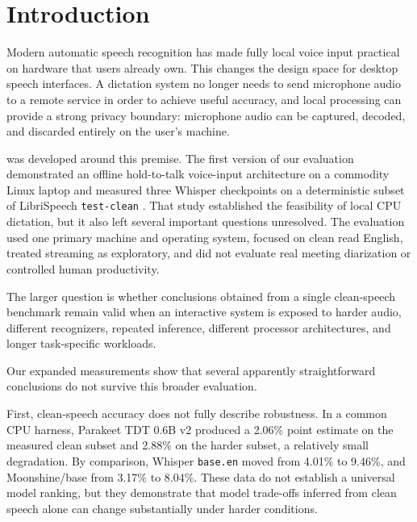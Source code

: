 \section{Introduction}

Modern automatic speech recognition has made fully local voice input practical on hardware that
users already own. This changes the design space for desktop speech interfaces. A dictation
system no longer needs to send microphone audio to a remote service in order to achieve useful
accuracy, and local processing can provide a strong privacy boundary: microphone audio can be
captured, decoded, and discarded entirely on the user's machine.

\YazSes{} was developed around this premise. The first version of our evaluation
\citep{yazses2026v1} demonstrated an offline hold-to-talk voice-input architecture on a commodity
Linux laptop and measured three Whisper checkpoints on a deterministic subset of LibriSpeech
\texttt{test-clean} \citep{panayotov2015librispeech}. That study established the feasibility of
local CPU dictation, but it also left several important questions unresolved. The evaluation used
one primary machine and operating system, focused on clean read English, treated streaming as
exploratory, and did not evaluate real meeting diarization or controlled human productivity.

The larger question is whether conclusions obtained from a single clean-speech benchmark remain
valid when an interactive system is exposed to harder audio, different recognizers, repeated
inference, different processor architectures, and longer task-specific workloads.

Our expanded measurements show that several apparently straightforward conclusions do not survive
this broader evaluation.

First, clean-speech accuracy does not fully describe robustness. In a common CPU harness,
Parakeet TDT 0.6B v2 produced a 2.06\% \wer{} point estimate on the measured clean subset and
2.88\% on the harder subset, a relatively small degradation. By comparison, Whisper
\texttt{base.en} moved from 4.01\% to 9.46\%, and Moonshine/base from 3.17\% to 8.04\%.
These data do not establish a universal model ranking, but they demonstrate that model trade-offs
inferred from clean speech alone can change substantially under harder conditions.

